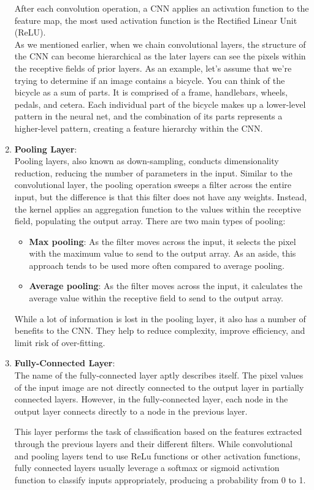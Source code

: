\begin{enumerate}
        After each convolution operation, a CNN applies an activation function to the feature map, the most used activation function is the Rectified Linear Unit (ReLU).\\
        As we mentioned earlier, when we chain convolutional layers, the structure of the CNN can become hierarchical as the later layers can see the pixels within the receptive fields of prior layers.  As an example, let’s assume that we’re trying to determine if an image contains a bicycle. You can think of the bicycle as a sum of parts. It is comprised of a frame, handlebars, wheels, pedals, and cetera. Each individual part of the bicycle makes up a lower-level pattern in the neural net, and the combination of its parts represents a higher-level pattern, creating a feature hierarchy within the CNN.
    \item \textbf{Pooling Layer}:\\
        Pooling layers, also known as down-sampling, conducts dimensionality reduction, reducing the number of parameters in the input. Similar to the convolutional layer, the pooling operation sweeps a filter across the entire input, but the difference is that this filter does not have any weights. Instead, the kernel applies an aggregation function to the values within the receptive field, populating the output array. There are two main types of pooling:
        \begin{itemize}
            \item \textbf{Max pooling}: As the filter moves across the input, it selects the pixel with the maximum value to send to the output array. As an aside, this approach tends to be used more often compared to average pooling.
            \item \textbf{Average pooling}: As the filter moves across the input, it calculates the average value within the receptive field to send to the output array.
        \end{itemize}
        
        While a lot of information is lost in the pooling layer, it also has a number of benefits to the CNN. They help to reduce complexity, improve efficiency, and limit risk of over-fitting.
    
    \item \textbf{Fully-Connected Layer}:\\
        The name of the fully-connected layer aptly describes itself. The pixel values of the input image are not directly connected to the output layer in partially connected layers. However, in the fully-connected layer, each node in the output layer connects directly to a node in the previous layer.

        This layer performs the task of classification based on the features extracted through the previous layers and their different filters. While convolutional and pooling layers tend to use ReLu functions or other activation functions, fully connected layers usually leverage a softmax or sigmoid activation function to classify inputs appropriately, producing a probability from 0 to 1.
        
\end{enumerate}

